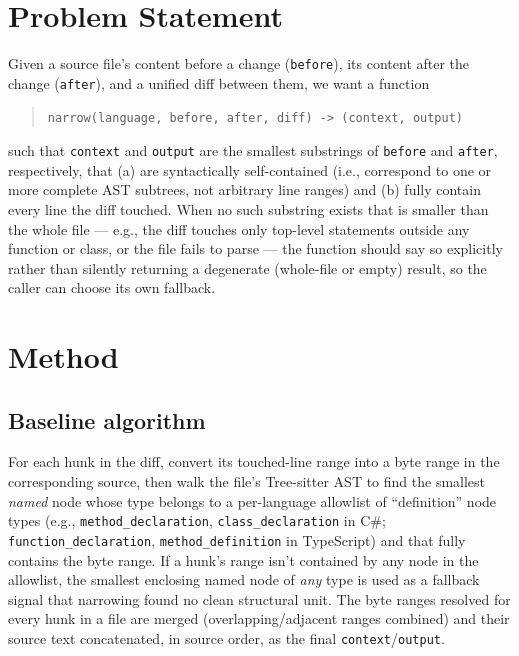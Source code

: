 \documentclass[11pt]{article}
\newcommand{\code}[1]{\texttt{#1}}
\begin{document}
\section{Problem Statement}

Given a source file's content before a change (\code{before}), its content after
the change (\code{after}), and a unified diff between them, we want a function

\begin{quote}
\code{narrow(language, before, after, diff) -> (context, output)}
\end{quote}

such that \code{context} and \code{output} are the smallest substrings of
\code{before} and \code{after}, respectively, that (a) are syntactically
self-contained (i.e., correspond to one or more complete AST subtrees, not
arbitrary line ranges) and (b) fully contain every line the diff touched. When no
such substring exists that is smaller than the whole file --- e.g., the diff
touches only top-level statements outside any function or class, or the file fails
to parse --- the function should say so explicitly rather than silently returning
a degenerate (whole-file or empty) result, so the caller can choose its own
fallback.

\section{Method}
\label{sec:method}

\subsection{Baseline algorithm}

For each hunk in the diff, convert its touched-line range into a byte range in the
corresponding source, then walk the file's Tree-sitter AST to find the smallest
\emph{named} node whose type belongs to a per-language allowlist of ``definition''
node types (e.g., \code{method\_declaration}, \code{class\_declaration} in C\#;
\code{function\_declaration}, \code{method\_definition} in TypeScript) and that
fully contains the byte range. If a hunk's range isn't contained by any node in the
allowlist, the smallest enclosing named node of \emph{any} type is used as a
fallback signal that narrowing found no clean structural unit. The byte ranges
resolved for every hunk in a file are merged (overlapping/adjacent ranges
combined) and their source text concatenated, in source order, as the final
\code{context}/\code{output}.
\end{document}
